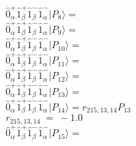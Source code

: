 \documentclass[14pt]{article}
\begin{document}
    $ \hat{0}_{\alpha}^{+}\hat{1}_{\beta}^{+}\hat{1}_{\beta}^{-}\hat{1}_{\alpha}^{-} \vert{P_{8}}\rangle =  $ \\ 
    $ \hat{0}_{\alpha}^{+}\hat{1}_{\beta}^{+}\hat{1}_{\beta}^{-}\hat{1}_{\alpha}^{-} \vert{P_{9}}\rangle =  $ \\ 
    $ \hat{0}_{\alpha}^{+}\hat{1}_{\beta}^{+}\hat{1}_{\beta}^{-}\hat{1}_{\alpha}^{-} \vert{P_{10}}\rangle =  $ \\ 
    $ \hat{0}_{\alpha}^{+}\hat{1}_{\beta}^{+}\hat{1}_{\beta}^{-}\hat{1}_{\alpha}^{-} \vert{P_{11}}\rangle =  $ \\ 
    $ \hat{0}_{\alpha}^{+}\hat{1}_{\beta}^{+}\hat{1}_{\beta}^{-}\hat{1}_{\alpha}^{-} \vert{P_{12}}\rangle =  $ \\ 
    $ \hat{0}_{\alpha}^{+}\hat{1}_{\beta}^{+}\hat{1}_{\beta}^{-}\hat{1}_{\alpha}^{-} \vert{P_{13}}\rangle =  $ \\ 
    $ \hat{0}_{\alpha}^{+}\hat{1}_{\beta}^{+}\hat{1}_{\beta}^{-}\hat{1}_{\alpha}^{-} \vert{P_{14}}\rangle = {r}_{215,13,14}P_{13} $ \\ 
    ${r}_{215,13,14}\ =\ -1.0 $ \\ 
    $ \hat{0}_{\alpha}^{+}\hat{1}_{\beta}^{+}\hat{1}_{\beta}^{-}\hat{1}_{\alpha}^{-} \vert{P_{15}}\rangle =  $ \\ 
    
\end{document}
